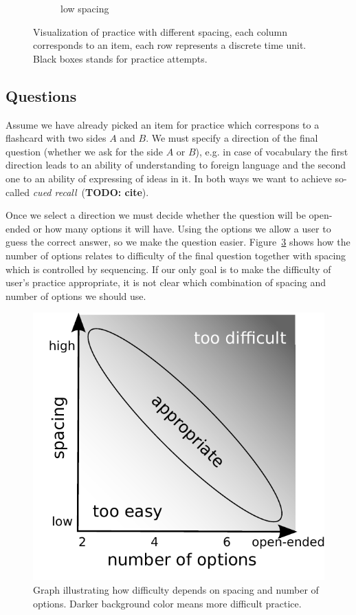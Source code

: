 \documentclass[table,color]{fithesis3/fithesis3}
\begin{document}
\begin{figure}
\begin{subfigure}[b]{.5\textwidth}
		\caption{low spacing}
		\label{figure:practice_progress_b}
	\end{subfigure}
	\caption{Visualization of practice with different spacing, each column
		corresponds to an item, each row represents a discrete time unit. Black
		boxes stands for practice attempts.}
	\label{figure:practice_progress}
\end{figure}

\subsection{Questions}

Assume we have already picked an item for practice which correspons to a
flashcard with two sides $A$ and $B$. We must specify a direction of the final
question (whether we ask for the side $A$ or $B$), e.g. in case of vocabulary
the first direction leads to an ability of understanding to foreign language
and the second one to an ability of expressing of ideas in it. In both ways we
want to achieve so-called \emph{cued recall}~(\textbf{TODO: cite}).

Once we select a direction we must decide whether the question will be
open-ended or how many options it will have. Using the options we allow a user
to guess the correct answer, so we make the question easier.
Figure~\ref{figure:options_vs_spacing} shows how the number of options relates
to difficulty of the final question together with spacing which is controlled
by sequencing. If our only goal is to make the difficulty of user's practice
appropriate, it is not clear which combination of spacing and number of options
we should use.

\begin{figure}[h]
	\begin{center}
		\includegraphics[width=.5\textwidth]{figure/options_vs_spacing}
	\end{center}
	\caption{Graph illustrating how difficulty depends on spacing and number of
		options. Darker background color means more difficult practice.}
	\label{figure:options_vs_spacing}
\end{figure}
\end{document}
